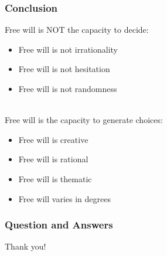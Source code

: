\documentclass[xcolor=dvipsnames]{beamer}
\theoremstyle{definition}
\begin{document}
\begin{frame}[fragile]
  \frametitle{Conclusion}

  Free will is NOT the \alert{capacity to decide}:
  \begin{itemize}
  \item Free will is not irrationality
  \item Free will is not hesitation
  \item Free will is not randomness
  \end{itemize}\\[0.6cm]

  Free will is the \alert{capacity to generate choices}:
  \begin{itemize}
  \item Free will is creative
  \item Free will is rational
  \item Free will is thematic
  \item Free will varies in degrees
  \end{itemize}
\end{frame}

\begin{frame}[fragile]
  \frametitle{Question and Answers}

  \begin{center}
    \Huge{Thank you!}
  \end{center}

\end{frame}
\end{document}
